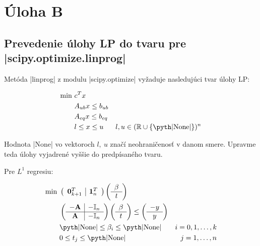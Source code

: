 \documentclass[report.tex]{subfiles}
\begin{document}
   

\section{Úloha B}


\subsection{Prevedenie úlohy LP do tvaru pre \pyth|scipy.optimize.linprog|}

Metóda \pyth|linprog| z modulu \pyth|scipy.optimize| vyžaduje nasledujúci tvar úlohy LP:

\begin{align*}
	\text{min}~ &c^Tx\\
	&A_{ub}x \leq b_{ub} \\
	&A_{eq}x \leq b_{eq} \\
	&l \leq x \leq u & l,u \in (\mathbb{R}\cup \{\text{\pyth|None|\}})^n 
\end{align*}

Hodnota \pyth|None| vo vektoroch $l,~u$ značí neohraničenosť v danom smere. Upravme teda úlohy vyjadrené vyššie do predpísaného tvaru.

Pre $L^1$ regresiu:

\begin{align*}
	\text{min}~ &
	\left(
	\begin{array}{c|c}
		\mathbf{0}_{k+1}^T & \mathbf{1}_n^T
	\end{array}
	\right)
	\left(
	\begin{array}{c}
		\beta \\
		\hline
		t
	\end{array}
	\right) \\
	&\left(
	\begin{array}{c|c}
		-\mathbf{A} & -\mathbb{I}_n \\
		\hline
		\mathbf{A} & -\mathbb{I}_n
	\end{array}
	\right)
	\left(
	\begin{array}{c}
		\beta \\
		\hline
		t
	\end{array}
	\right)
	\leq
	\left(
	\begin{array}{c}
		-y \\
		\hline
		y
	\end{array}
	\right) \\
	&\text{\pyth|None|} \leq \beta_i \leq \text{\pyth|None|} &i = 0,1,\dots,k\\
	&0 \leq t_j \leq \text{\pyth|None|} &j = 1,\dots,n
\end{align*}
\end{document}
